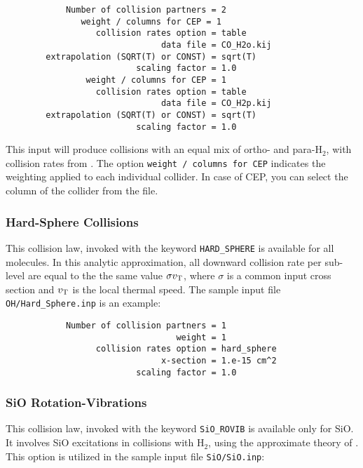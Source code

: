 \documentclass[12pt]{article}
\def\separation {0.5cm}
\begin{document}
\vspace{\separation}
\begin{verbatim}
            Number of collision partners = 2
               weight / columns for CEP = 1
                  collision rates option = table
                               data file = CO_H2o.kij
        extrapolation (SQRT(T) or CONST) = sqrt(T)
                          scaling factor = 1.0
                weight / columns for CEP = 1
                  collision rates option = table
                               data file = CO_H2p.kij
        extrapolation (SQRT(T) or CONST) = sqrt(T)
                          scaling factor = 1.0
\end{verbatim}
This input will produce collisions with an equal mix of ortho- and para-H$_2$,
with collision rates from \cite{flower01}. The option \texttt{weight / columns for CEP}
indicates the weighting applied to each individual collider. In case of CEP, you can
select the column of the collider from the file.


\subsubsection{Hard-Sphere Collisions}

This collision law, invoked with the keyword \texttt{HARD\_SPHERE} is available
for all molecules. In this analytic approximation, all downward collision rate
per sub-level are equal to the the same value $\sigma v_{\rm T}$, where
$\sigma$ is a common input cross section and $v_{\rm T}$ is the local thermal
speed. The sample input file \texttt{OH/Hard\_Sphere.inp} is an example:

\vspace{\separation}
\begin{verbatim}
            Number of collision partners = 1
                                  weight = 1
                  collision rates option = hard_sphere
                               x-section = 1.e-15 cm^2
                          scaling factor = 1.0
\end{verbatim}

\subsubsection{SiO Rotation-Vibrations}

This collision law, invoked with the keyword \texttt{SiO\_ROVIB} is available
only for SiO. It involves SiO excitations in collisions with H$_2$, using the
approximate theory of \cite{bieniek_green83}. This option is utilized in the sample
input file \texttt{SiO/SiO.inp}:
\end{document}
